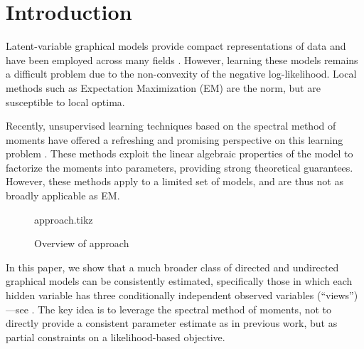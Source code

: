 \section{Introduction}
\label{sec:introduction}

Latent-variable graphical models provide compact representations of data
and have been employed across many fields %
\cite{ghahramani1999variational,jaakkola2011variational,blei03lda,quattoni04crf,beaumont2004bayesian,haghighi06prototype}.
However, learning these models remains a difficult problem due to the
non-convexity of the negative log-likelihood.  Local methods such as Expectation Maximization (EM)
are the norm, but are susceptible to local optima.

Recently, unsupervised learning techniques based on the spectral method of moments
have offered a refreshing and promising perspective on
this learning problem
\citep{mossel2005learning,
hsu09spectral,
bailly2010spectral,
song2011spectral,
anandkumar11tree,anandkumar12moments,anandkumar12lda,
hsu12identifiability,
balle12automata}.
These methods exploit the linear algebraic properties of the model to
factorize the moments into parameters, providing strong theoretical guarantees.
However, these methods apply to a limited set of models, and are thus
not as broadly applicable as EM.

\begin{figure}[t]
  \label{fig:approach}
  \centering
  {approach.tikz}
  \caption{ Overview of approach}
\end{figure}


In this paper,
we show that a much broader class of directed and undirected graphical models can be consistently estimated,
specifically those in which each hidden variable has three conditionally
independent observed variables (``views'')---see .
The key idea is to leverage the spectral method of moments,
not to directly provide a consistent parameter estimate as in previous work,
but as partial constraints on a likelihood-based objective.

